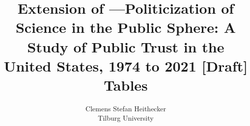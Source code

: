 \documentclass[12pt, a4paper, titlepage]{article}
\title{Extension of \citet{gauchat-2012}---Politicization of Science in the Public Sphere: A Study of Public Trust in the United States, 1974 to 2021 [Draft] \\[0.2em] \Large Tables}
\author{Clemens Stefan Heithecker \\ Tilburg University}
\begin{document}
\nocite{davern-2021}
\nocite{gauchat-2012}


\maketitle



\clearpage


\clearpage


\clearpage


\clearpage


\clearpage
\printbibliography
\end{document}
